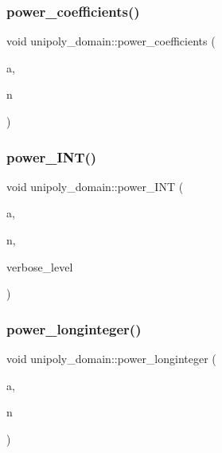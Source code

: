 \subsubsection{\texorpdfstring{power\+\_\+coefficients()}{power\_coefficients()}}
{\footnotesize\ttfamily void unipoly\+\_\+domain\+::power\+\_\+coefficients (\begin{DoxyParamCaption}\item[{\mbox{\hyperlink{galois_8h_a77ca58de3d2da6172242493dd9c8aaa8}{unipoly\+\_\+object}} \&}]{a,  }\item[{\mbox{\hyperlink{galois_8h_a09fddde158a3a20bd2dcadb609de11dc}{I\+NT}}}]{n }\end{DoxyParamCaption})}

\mbox{\label{classunipoly__domain_afb7679c16c8e33167df2b95e6d191f79}} 
\subsubsection{\texorpdfstring{power\+\_\+\+I\+N\+T()}{power\_INT()}}
{\footnotesize\ttfamily void unipoly\+\_\+domain\+::power\+\_\+\+I\+NT (\begin{DoxyParamCaption}\item[{\mbox{\hyperlink{galois_8h_a77ca58de3d2da6172242493dd9c8aaa8}{unipoly\+\_\+object}} \&}]{a,  }\item[{\mbox{\hyperlink{galois_8h_a09fddde158a3a20bd2dcadb609de11dc}{I\+NT}}}]{n,  }\item[{\mbox{\hyperlink{galois_8h_a09fddde158a3a20bd2dcadb609de11dc}{I\+NT}}}]{verbose\+\_\+level }\end{DoxyParamCaption})}

\mbox{\label{classunipoly__domain_a54f5bf4dfb804ba70711fa9a75dfe69b}} 
\subsubsection{\texorpdfstring{power\+\_\+longinteger()}{power\_longinteger()}}
{\footnotesize\ttfamily void unipoly\+\_\+domain\+::power\+\_\+longinteger (\begin{DoxyParamCaption}\item[{\mbox{\hyperlink{galois_8h_a77ca58de3d2da6172242493dd9c8aaa8}{unipoly\+\_\+object}} \&}]{a,  }\item[{\mbox{\hyperlink{classlonginteger__object}{longinteger\+\_\+object}} \&}]{n }\end{DoxyParamCaption})}

